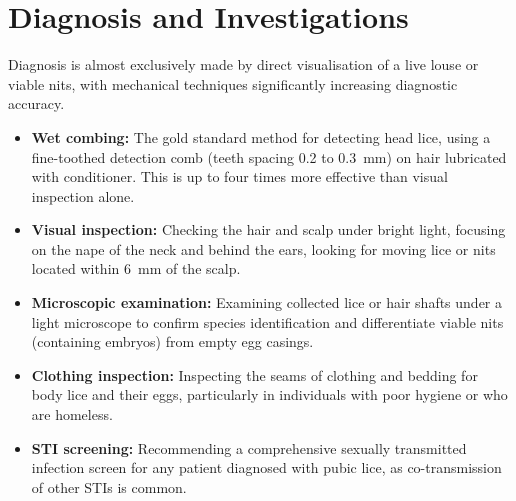 \section*{Diagnosis and Investigations}
Diagnosis is almost exclusively made by direct visualisation of a live louse or viable nits, with mechanical techniques significantly increasing diagnostic accuracy.
\begin{itemize}
    \item \textbf{Wet combing:} The gold standard method for detecting head lice, using a fine-toothed detection comb (teeth spacing 0.2 to 0.3~mm) on hair lubricated with conditioner. This is up to four times more effective than visual inspection alone.
    \item \textbf{Visual inspection:} Checking the hair and scalp under bright light, focusing on the nape of the neck and behind the ears, looking for moving lice or nits located within 6~mm of the scalp.
    \item \textbf{Microscopic examination:} Examining collected lice or hair shafts under a light microscope to confirm species identification and differentiate viable nits (containing embryos) from empty egg casings.
    \item \textbf{Clothing inspection:} Inspecting the seams of clothing and bedding for body lice and their eggs, particularly in individuals with poor hygiene or who are homeless.
    \item \textbf{STI screening:} Recommending a comprehensive sexually transmitted infection screen for any patient diagnosed with pubic lice, as co-transmission of other STIs is common.
\end{itemize}

